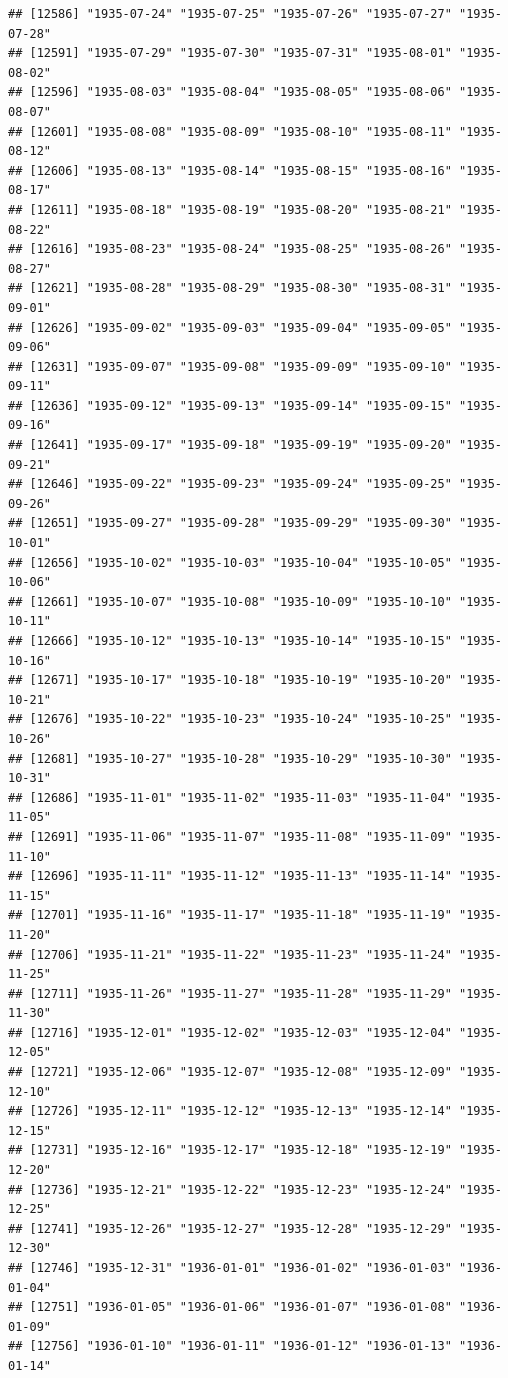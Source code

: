 \documentclass{article}\usepackage[]{graphicx}\usepackage[]{color}
\makeatletter
\newenvironment{kframe}{%
 \def\at@end@of@kframe{}%
 \ifinner\ifhmode%
  \def\at@end@of@kframe{\end{minipage}}%
  \begin{minipage}{\columnwidth}%
 \fi\fi%
 \def\FrameCommand##1{\hskip\@totalleftmargin \hskip-\fboxsep
 \colorbox{shadecolor}{##1}\hskip-\fboxsep
     \hskip-\linewidth \hskip-\@totalleftmargin \hskip\columnwidth}%
 \MakeFramed {\advance\hsize-\width
   \@totalleftmargin\z@ \linewidth\hsize
   \@setminipage}}%
 {\par\unskip\endMakeFramed%
 \at@end@of@kframe}
\newenvironment{knitrout}{}{} %
\makeatother
\begin{document}
\begin{description}
\begin{knitrout}
\begin{kframe}
\begin{verbatim}
## [12586] "1935-07-24" "1935-07-25" "1935-07-26" "1935-07-27" "1935-07-28"
## [12591] "1935-07-29" "1935-07-30" "1935-07-31" "1935-08-01" "1935-08-02"
## [12596] "1935-08-03" "1935-08-04" "1935-08-05" "1935-08-06" "1935-08-07"
## [12601] "1935-08-08" "1935-08-09" "1935-08-10" "1935-08-11" "1935-08-12"
## [12606] "1935-08-13" "1935-08-14" "1935-08-15" "1935-08-16" "1935-08-17"
## [12611] "1935-08-18" "1935-08-19" "1935-08-20" "1935-08-21" "1935-08-22"
## [12616] "1935-08-23" "1935-08-24" "1935-08-25" "1935-08-26" "1935-08-27"
## [12621] "1935-08-28" "1935-08-29" "1935-08-30" "1935-08-31" "1935-09-01"
## [12626] "1935-09-02" "1935-09-03" "1935-09-04" "1935-09-05" "1935-09-06"
## [12631] "1935-09-07" "1935-09-08" "1935-09-09" "1935-09-10" "1935-09-11"
## [12636] "1935-09-12" "1935-09-13" "1935-09-14" "1935-09-15" "1935-09-16"
## [12641] "1935-09-17" "1935-09-18" "1935-09-19" "1935-09-20" "1935-09-21"
## [12646] "1935-09-22" "1935-09-23" "1935-09-24" "1935-09-25" "1935-09-26"
## [12651] "1935-09-27" "1935-09-28" "1935-09-29" "1935-09-30" "1935-10-01"
## [12656] "1935-10-02" "1935-10-03" "1935-10-04" "1935-10-05" "1935-10-06"
## [12661] "1935-10-07" "1935-10-08" "1935-10-09" "1935-10-10" "1935-10-11"
## [12666] "1935-10-12" "1935-10-13" "1935-10-14" "1935-10-15" "1935-10-16"
## [12671] "1935-10-17" "1935-10-18" "1935-10-19" "1935-10-20" "1935-10-21"
## [12676] "1935-10-22" "1935-10-23" "1935-10-24" "1935-10-25" "1935-10-26"
## [12681] "1935-10-27" "1935-10-28" "1935-10-29" "1935-10-30" "1935-10-31"
## [12686] "1935-11-01" "1935-11-02" "1935-11-03" "1935-11-04" "1935-11-05"
## [12691] "1935-11-06" "1935-11-07" "1935-11-08" "1935-11-09" "1935-11-10"
## [12696] "1935-11-11" "1935-11-12" "1935-11-13" "1935-11-14" "1935-11-15"
## [12701] "1935-11-16" "1935-11-17" "1935-11-18" "1935-11-19" "1935-11-20"
## [12706] "1935-11-21" "1935-11-22" "1935-11-23" "1935-11-24" "1935-11-25"
## [12711] "1935-11-26" "1935-11-27" "1935-11-28" "1935-11-29" "1935-11-30"
## [12716] "1935-12-01" "1935-12-02" "1935-12-03" "1935-12-04" "1935-12-05"
## [12721] "1935-12-06" "1935-12-07" "1935-12-08" "1935-12-09" "1935-12-10"
## [12726] "1935-12-11" "1935-12-12" "1935-12-13" "1935-12-14" "1935-12-15"
## [12731] "1935-12-16" "1935-12-17" "1935-12-18" "1935-12-19" "1935-12-20"
## [12736] "1935-12-21" "1935-12-22" "1935-12-23" "1935-12-24" "1935-12-25"
## [12741] "1935-12-26" "1935-12-27" "1935-12-28" "1935-12-29" "1935-12-30"
## [12746] "1935-12-31" "1936-01-01" "1936-01-02" "1936-01-03" "1936-01-04"
## [12751] "1936-01-05" "1936-01-06" "1936-01-07" "1936-01-08" "1936-01-09"
## [12756] "1936-01-10" "1936-01-11" "1936-01-12" "1936-01-13" "1936-01-14"

\end{verbatim}
\end{kframe}
\end{knitrout}
\end{description}
\end{document}
